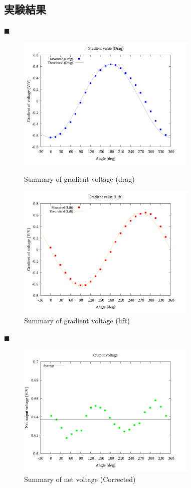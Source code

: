 \documentclass[twocolumn,a4j]{jsarticle}
\begin{document}
\newpage

\subsection{実験結果}

$\blacksquare$ 

\begin{figure}[htbp]
    \footnotesize
    \begin{center}
        \includegraphics[width=86mm]{../graphes/1-ex/21/21-1_summary_drag.png}
        \caption{Summary of gradient voltage (drag)}
        \includegraphics[width=86mm]{../graphes/1-ex/21/21-1_summary_lift.png}
        \caption{Summary of gradient voltage (lift)}
    \end{center}
\end{figure}

$\blacksquare$ 

\begin{figure}[htbp]
    \footnotesize
    \begin{center}
        \includegraphics[width=86mm]{../graphes/1-ex/09/09_summary-outputvoltage-net.png}
        \caption{Summary of net voltage (Corrected)}
    \end{center}
\end{figure}
\end{document}
